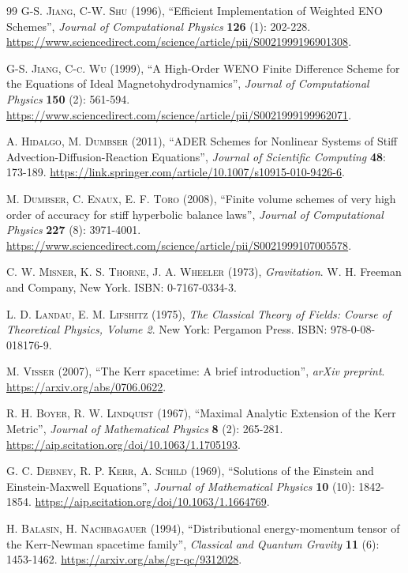 \documentclass{article}
\begin{document}
\begin{thebibliography}{99}
\textsc{G-S. Jiang, C-W. Shu} (1996), ``Efficient Implementation of Weighted ENO Schemes'', \textit{Journal of Computational Physics} \textbf{126} (1): 202-228. \url{https://www.sciencedirect.com/science/article/pii/S0021999196901308}.

\textsc{G-S. Jiang, C-c. Wu} (1999), ``A High-Order WENO Finite Difference Scheme for the Equations of Ideal Magnetohydrodynamics'', \textit{Journal of Computational Physics} \textbf{150} (2): 561-594. \url{https://www.sciencedirect.com/science/article/pii/S0021999199962071}.

\textsc{A. Hidalgo, M. Dumbser} (2011), ``ADER Schemes for Nonlinear Systems of Stiff Advection-Diffusion-Reaction Equations'', \textit{Journal of Scientific Computing} \textbf{48}: 173-189. \url{https://link.springer.com/article/10.1007/s10915-010-9426-6}.

\textsc{M. Dumbser, C. Enaux, E. F. Toro} (2008), ``Finite volume schemes of very high order of accuracy for stiff hyperbolic balance laws'', \textit{Journal of Computational Physics} \textbf{227} (8): 3971-4001. \url{https://www.sciencedirect.com/science/article/pii/S0021999107005578}.

\textsc{C. W. Misner, K. S. Thorne, J. A. Wheeler} (1973), \textit{Gravitation}. W. H. Freeman and Company, New York. ISBN: 0-7167-0334-3.

\textsc{L. D. Landau, E. M. Lifshitz} (1975), \textit{The Classical Theory of Fields: Course of Theoretical Physics, Volume 2}. New York: Pergamon Press. ISBN: 978-0-08-018176-9.

\textsc{M. Visser} (2007), ``The Kerr spacetime: A brief introduction'', \textit{arXiv preprint}. \url{https://arxiv.org/abs/0706.0622}.

\textsc{R. H. Boyer, R. W. Lindquist} (1967), ``Maximal Analytic Extension of the Kerr Metric'', \textit{Journal of Mathematical Physics} \textbf{8} (2): 265-281. \url{https://aip.scitation.org/doi/10.1063/1.1705193}.

\textsc{G. C. Debney, R. P. Kerr, A. Schild} (1969), ``Solutions of the Einstein and Einstein-Maxwell Equations'', \textit{Journal of Mathematical Physics} \textbf{10} (10): 1842-1854. \url{https://aip.scitation.org/doi/10.1063/1.1664769}.

\textsc{H. Balasin, H. Nachbagauer} (1994), ``Distributional energy-momentum tensor of the Kerr-Newman spacetime family'', \textit{Classical and Quantum Gravity} \textbf{11} (6): 1453-1462. \url{https://arxiv.org/abs/gr-qc/9312028}.


\end{thebibliography}
\end{document}

